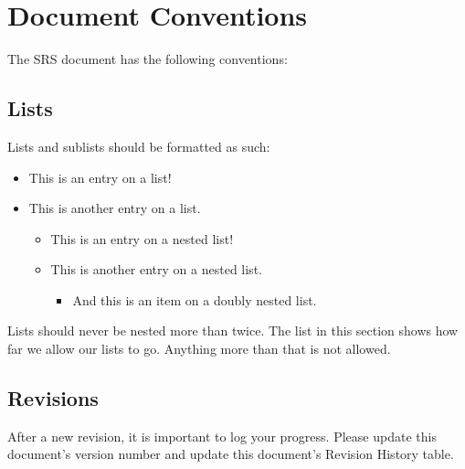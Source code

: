 \documentclass{scrreprt}
\begin{document}
\section{Document Conventions}
$ $The SRS document has the following conventions:$ $
\subsection{Lists}
$ $Lists and sublists should be formatted as such:
\begin{itemize}
    \item This is an entry on a list!
    \item This is another entry on a list.
          \begin{itemize}
              \item This is an entry on a nested list!
              \item This is another entry on a nested list.
                    \begin{itemize}
                        \item And this is an item on a doubly nested list.
                    \end{itemize}
          \end{itemize}
\end{itemize}
Lists should never be nested more than twice.
The list in this section shows how far we allow our lists to go.
Anything more than that is not allowed.

\subsection{Revisions}
After a new revision, it is important to log your progress.
Please update this document's version number and update this document's Revision History table.
\end{document}
